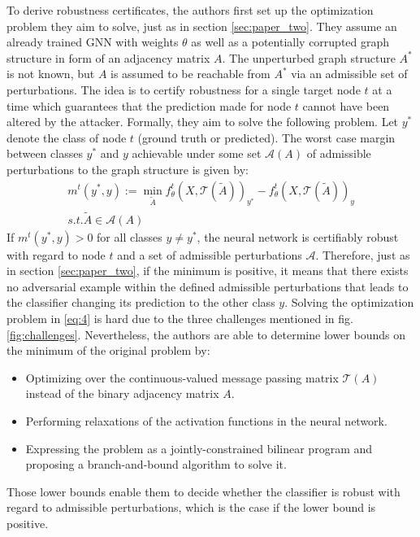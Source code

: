 \documentclass[a4paper,preprint]{sig-alternate}
\begin{document}
To derive robustness certificates, the authors first set up the optimization problem they aim to solve, just
as in section \ref{sec:paper_two}. They assume an already trained GNN with weights $\theta$ as well as a potentially corrupted graph
structure in form of an adjacency matrix $A$. The unperturbed graph structure $A^{\ast}$ is not known, but $A$ is
assumed to be reachable from $A^{\ast}$ via an admissible set of perturbations. 
The idea is to certify robustness for a single target node $t$ at a time which guarantees that the prediction
made for node $t$ cannot have been altered by the attacker.
Formally, they aim to solve the following problem.
Let $y^{\ast}$ denote the class of node $t$ (ground truth or predicted). The worst case margin between classes $y^{\ast}$ and $y$
achievable under some set $\mathcal{A}(A)$ of admissible perturbations to the graph structure is given by:
\begin{gather}
\label{eq:4}
    m^t (y^{\ast}, y) := \min_{\tilde{A}} f_{\theta}^t (X, \mathcal{T}(\tilde{A}))_{y^{\ast}}
    - f_{\theta}^t (X, \mathcal{T}(\tilde{A}))_y \\
    s.t. \tilde{A} \in \mathcal{A}(A) \nonumber
\end{gather}
If $m^t (y^{\ast}, y) > 0$ for all classes $y \neq y^{\ast}$, the neural network is certifiably robust with regard to node $t$
and a set of admissible perturbations $\mathcal{A}$. Therefore, just as in section \ref{sec:paper_two}, if the minimum is positive, 
it means that there exists no adversarial example within the defined admissible perturbations that leads to the classifier changing its 
prediction to the other class $y$. Solving the optimization problem in \ref{eq:4} is hard due to the three challenges mentioned in fig. \ref{fig:challenges}.
Nevertheless, the authors are able to determine lower bounds on the minimum of the original problem by:
\begin{itemize}
    \item Optimizing over the continuous-valued message passing matrix $\mathcal{T}(A)$ instead of the binary
    adjacency matrix $A$.
    \item Performing relaxations of the activation functions in the neural network.
    \item Expressing the problem as a jointly-constrained bilinear program and proposing a branch-and-bound algorithm to solve it.
\end{itemize}
Those lower bounds enable them to decide whether the classifier is robust with regard to admissible perturbations,
which is the case if the lower bound is positive.\newline
\end{document}
